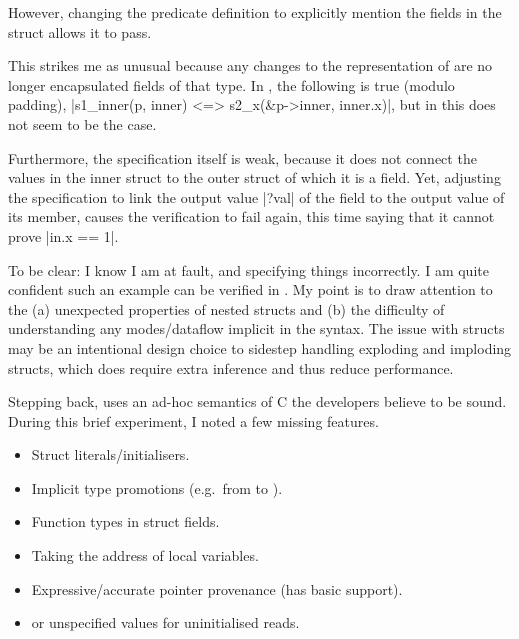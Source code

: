 
However, changing the predicate definition to explicitly mention the fields in
the  struct allows it to pass.

This strikes me as unusual because any changes to the representation of
 are no longer encapsulated fields of that type. In ,
the following is true (modulo padding),
\cninline[breaklines]|s1_inner(p, inner) <=> s2_x(&p->inner, inner.x)|,%
 but in  this does not seem
to be the case.

Furthermore, the specification itself is weak, because it does not connect the
values in the inner struct to the outer struct of which it is a field. Yet,
adjusting the specification to link the output value \cninline|?val| of the
field to the output value of its member, causes the verification to fail again,
this time saying that it cannot prove \cninline|in.x == 1|.


To be clear: I know I am at fault, and specifying things incorrectly. I am
quite confident such an example can be verified in . My point is
to draw attention to the (a) unexpected properties of nested structs and (b)
the difficulty of understanding any modes/dataflow implicit in the syntax. The
issue with structs may be an intentional design choice to sidestep handling
exploding and imploding structs, which does require extra inference and thus
reduce performance.

Stepping back,  uses an ad-hoc semantics of C the developers
believe to be sound. During this brief experiment, I noted a few missing
features.
\begin{itemize}
    \item Struct literals/initialisers.
    \item Implicit type promotions (e.g.\ from  to
        ).
    \item Function types in struct fields.
    \item Taking the address of local variables.
    \item Expressive/accurate pointer provenance (has basic support).
    \item {} or unspecified values for uninitialised reads.
\end{itemize}

